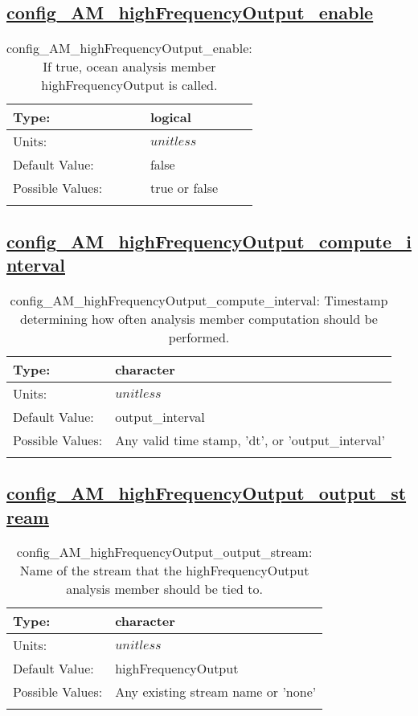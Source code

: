 \subsection[config\_AM\_highFrequencyOutput\_enable]{\hyperref[sec:nm_tab_AM_highFrequencyOutput]{config\_AM\_highFrequencyOutput\_enable}}
\label{subsec:nm_sec_config_AM_highFrequencyOutput_enable}
\begin{center}
\begin{longtable}{| p{2.0in} || p{4.0in} |}
    \hline
    Type: & logical \\
    \hline
    Units: & $unitless$ \\
    \hline
    Default Value: & false \\
    \hline
    Possible Values: & true or false \\
    \hline
    \caption{config\_AM\_highFrequencyOutput\_enable: If true, ocean analysis member highFrequencyOutput is called.}
\end{longtable}
\end{center}
\subsection[config\_AM\_highFrequencyOutput\_compute\_interval]{\hyperref[sec:nm_tab_AM_highFrequencyOutput]{config\_AM\_highFrequencyOutput\_compute\_interval}}
\label{subsec:nm_sec_config_AM_highFrequencyOutput_compute_interval}
\begin{center}
\begin{longtable}{| p{2.0in} || p{4.0in} |}
    \hline
    Type: & character \\
    \hline
    Units: & $unitless$ \\
    \hline
    Default Value: & output\_interval \\
    \hline
    Possible Values: & Any valid time stamp, 'dt', or 'output\_interval' \\
    \hline
    \caption{config\_AM\_highFrequencyOutput\_compute\_interval: Timestamp determining how often analysis member computation should be performed.}
\end{longtable}
\end{center}
\subsection[config\_AM\_highFrequencyOutput\_output\_stream]{\hyperref[sec:nm_tab_AM_highFrequencyOutput]{config\_AM\_highFrequencyOutput\_output\_stream}}
\label{subsec:nm_sec_config_AM_highFrequencyOutput_output_stream}
\begin{center}
\begin{longtable}{| p{2.0in} || p{4.0in} |}
    \hline
    Type: & character \\
    \hline
    Units: & $unitless$ \\
    \hline
    Default Value: & highFrequencyOutput \\
    \hline
    Possible Values: & Any existing stream name or 'none' \\
    \hline
    \caption{config\_AM\_highFrequencyOutput\_output\_stream: Name of the stream that the highFrequencyOutput analysis member should be tied to.}
\end{longtable}
\end{center}
